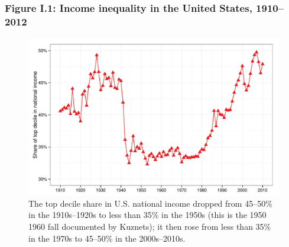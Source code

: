 \documentclass[t]{beamer}\usepackage[]{graphicx}\usepackage[]{color}
\newenvironment{knitrout}{}{} %
\begin{document}
\begin{frame}[label=Figure_0_1,fragile]
\frametitle{Figure I.1: Income inequality in the United States, 1910--2012}
\begin{figure}[t]
\begin{minipage}[b]{\textwidth}
\centering
\begin{knitrout}\footnotesize
{}\color{fgcolor}

{\centering \includegraphics[width=1\linewidth]{figures/color/Figure_0_1} 

}



\end{knitrout}
\caption{The top decile share in U.S. national income dropped from 45--50\% in the 1910s--1920s to less than 35\% in the 1950s (this is the
1950 1960 fall documented by Kuznets); it then rose from less than 35\% in the 1970s to 45--50\% in the 2000s--2010s.}
\end{minipage}
\end{figure}
\end{frame}
\end{document}
